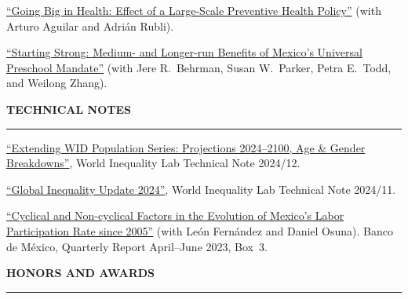 \documentclass[11pt,letterpaper]{article}
\renewcommand{\section}[1]{%
  \vspace{0.8em}%
  {\large\bfseries\MakeUppercase{#1}}%
  \vspace{0.3em}%
  \hrule%
  \vspace{0.4em}%
}
\begin{document}
\href{https://ricardogomezcarrera.com/research/working\_papers/Big\_in\_Health.pdf}{``Going Big in Health: Effect of a Large-Scale Preventive Health Policy''} (with Arturo Aguilar and Adri\'{a}n Rubli).

\href{https://economics.sas.upenn.edu/pier/working-paper/2024/starting-strong-medium-and-longer-run-benefits-mexicos-universal-preschool}{``Starting Strong: Medium- and Longer-run Benefits of Mexico's Universal Preschool Mandate''} (with Jere R.\ Behrman, Susan W.\ Parker, Petra E.\ Todd, and Weilong Zhang).


\section{Technical Notes}

\href{https://wid.world/document/extending-wid-population-series-projections-2024-2100-age-gender-breakdowns-world-inequality-lab-technical-note-2024-12/}{``Extending WID Population Series: Projections 2024--2100, Age \& Gender Breakdowns''}, World Inequality Lab Technical Note 2024/12.

\href{https://wid.world/document/global-inequality-update-2024-technical-note/}{``Global Inequality Update 2024''}, World Inequality Lab Technical Note 2024/11.

\href{https://ricardogomezcarrera.com/research/technical\_notes/Factores\_ciclicos\_banxico.pdf}{``Cyclical and Non-cyclical Factors in the Evolution of Mexico's Labor Participation Rate since 2005''} (with Le\'{o}n Fern\'{a}ndez and Daniel Osuna). Banco de M\'{e}xico, Quarterly Report April--June 2023, Box~3.


\section{Honors and Awards}
\end{document}
